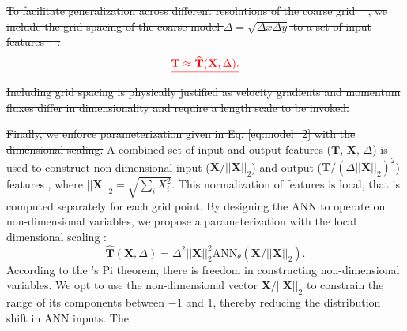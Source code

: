 \documentclass[draft]{agujournal2019}
\providecommand{\DIFadd}[1]{{\protect\color{blue}\uwave{#1}}} %
\providecommand{\DIFdel}[1]{{\protect\color{red}\sout{#1}}}                      %
\providecommand{\DIFaddbegin}{} %
\providecommand{\DIFaddend}{} %
\providecommand{\DIFdelbegin}{} %
\providecommand{\DIFdelend}{} %
\begin{document}
\DIFdelbegin \DIFdel{To facilitate generalization across different resolutions of the coarse grid \mbox{%
\cite<scale-aware or grid-aware parameterization,>{bachman2017scale}}\hskip0pt%
, we include the grid spacing of the coarse model $\Delta = \sqrt{\Delta x \Delta y}$ to a set of input features \mbox{%
\cite{lund1993parameterization, li2025transformer}}\hskip0pt%
:
}\begin{displaymath}
    \DIFdel{\mathbf{T} \approx \widehat{\mathbf{T}}(\mathbf{X}, \Delta). \label{eq:model_2}
}\end{displaymath}%
\DIFdel{Including grid spacing is physically justified as velocity gradients and momentum fluxes differ in dimensionality and require a length scale to be invoked.
}\DIFdelend %

\DIFdelbegin \DIFdel{Finally, we enforce parameterization given in Eq. \eqref{eq:model_2} with the dimensional scaling. }\DIFdelend %
A combined set of input and output features ($\mathbf{T}$, $\mathbf{X}$, $\Delta$) is used to construct non-dimensional input ($\mathbf{X} / ||\mathbf{X}||_2$) and output ($\mathbf{T} / (\Delta ||\mathbf{X}||_2)^2$) features \DIFaddbegin \DIFadd{(step 2 in Section \ref{sec:general_algorithm})}\DIFaddend , where $||\mathbf{X}||_2= \sqrt{\sum_i X_i^2}$. This normalization of features is local, that is computed separately for each grid point. By designing the ANN to operate on non-dimensional variables, we propose a parameterization with the local dimensional scaling \cite{reissmann2021application, prakash2022invariant}:
\begin{equation}
    \widehat{\mathbf{T}}(\mathbf{X}, \Delta) = \Delta^2 ||\mathbf{X}||_2^2 \mathrm{ANN}_{\theta} (\mathbf{X} / ||\mathbf{X}||_2). \label{eq:model_3}
\end{equation}
According to the 's Pi theorem, there is freedom in constructing non-dimensional variables. We opt to use the non-dimensional vector $\mathbf{X} / ||\mathbf{X}||_2$ to constrain the range of its components between $-1$ and $1$, thereby reducing the distribution shift in ANN inputs. 
\DIFdelbegin \DIFdel{The }\DIFdelend \DIFaddbegin 
\end{document}
